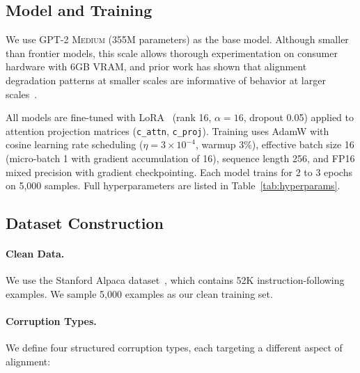 \documentclass[conference]{IEEEtran}
\newcommand{\model}{\textsc{GPT-2 Medium}}
\begin{document}
\subsection{Model and Training}

We use \model{} (355M parameters) as the base model. Although smaller than frontier models, this scale allows thorough experimentation on consumer hardware with 6GB VRAM, and prior work has shown that alignment degradation patterns at smaller scales are informative of behavior at larger scales~\cite{mazeika2025scaling}.

All models are fine-tuned with LoRA~\cite{hu2021lora} (rank 16, $\alpha=16$, dropout 0.05) applied to attention projection matrices (\texttt{c\_attn}, \texttt{c\_proj}). Training uses AdamW with cosine learning rate scheduling ($\eta = 3 \times 10^{-4}$, warmup 3\%), effective batch size 16 (micro-batch 1 with gradient accumulation of 16), sequence length 256, and FP16 mixed precision with gradient checkpointing. Each model trains for 2 to 3 epochs on 5,000 samples. Full hyperparameters are listed in Table~\ref{tab:hyperparams}.

\subsection{Dataset Construction}
\label{sec:dataset}

\paragraph{Clean Data.}
We use the Stanford Alpaca dataset~\cite{taori2023alpaca}, which contains 52K instruction-following examples. We sample 5,000 examples as our clean training set.

\paragraph{Corruption Types.}
We define four structured corruption types, each targeting a different aspect of alignment:
\end{document}
